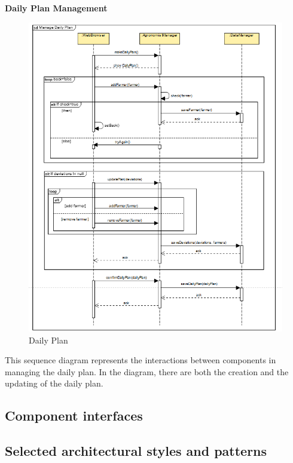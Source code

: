 \documentclass[table, 12pt]{article}
\begin{document}
\newpage
\textbf{Daily Plan Management}
\begin{center}
    \begin{figure}[H]
        
        \includegraphics[scale=0.55, center]{assets/SequenceDiagram/ManageDailyPlan.png}
        \caption{Daily Plan}
        \label{fig: dailyPlan}
    \end{figure}
\end{center}
This sequence diagram represents the interactions between components in managing the daily plan.
In the diagram, there are both the creation and the updating of the daily plan.





\subsection{Component interfaces}

\subsection{Selected architectural styles and patterns}
\end{document}
